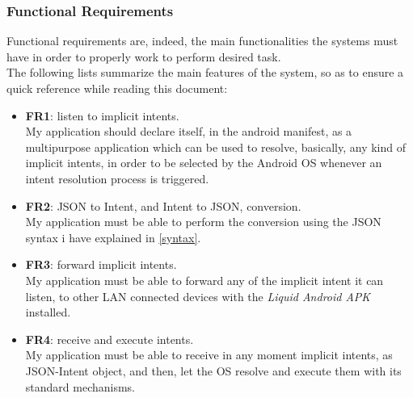 \subsubsection{Functional Requirements}
Functional requirements are, indeed, the main functionalities the systems must have in order to properly work to perform desired task.\\
The following lists summarize the main features of the system, so as to ensure a quick reference while reading this document:
\begin{itemize}
	\item \textbf{FR1}: listen to implicit intents.\\My application should declare itself, in the android manifest, as a multipurpose application which can be used to resolve, basically, any kind of implicit intents, in order to be selected by the Android OS whenever an intent resolution process is triggered.
	\item \textbf{FR2}: JSON to Intent, and Intent to JSON, conversion.\\ My application must be able to perform the conversion using the JSON syntax i have explained in \ref{syntax}.
	\item \textbf{FR3}: forward implicit intents.\\ My application must be able to forward any of the implicit intent it can listen, to other LAN connected devices with the \textit{Liquid Android APK} installed.
	\item \textbf{FR4}: receive and execute intents.\\ My application must be able to receive in any moment implicit intents, as JSON-Intent object, and then, let the OS resolve and execute them with its standard mechanisms.
\end{itemize}
